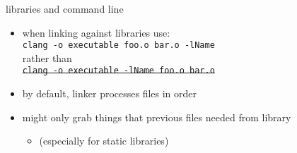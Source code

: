 
\begin{frame}{libraries and command line}
\begin{itemize}
\item when linking against libraries use: \\
\texttt{clang -o executable foo.o bar.o -lName} \\
rather than \\
\sout{\texttt{clang -o executable -lName foo.o bar.o}} \\
\item by default, linker processes files in order 
\item might only grab things that previous files needed from library
    \begin{itemize}
    \item (especially for static libraries)
    \end{itemize}
\end{itemize}
\end{frame}
